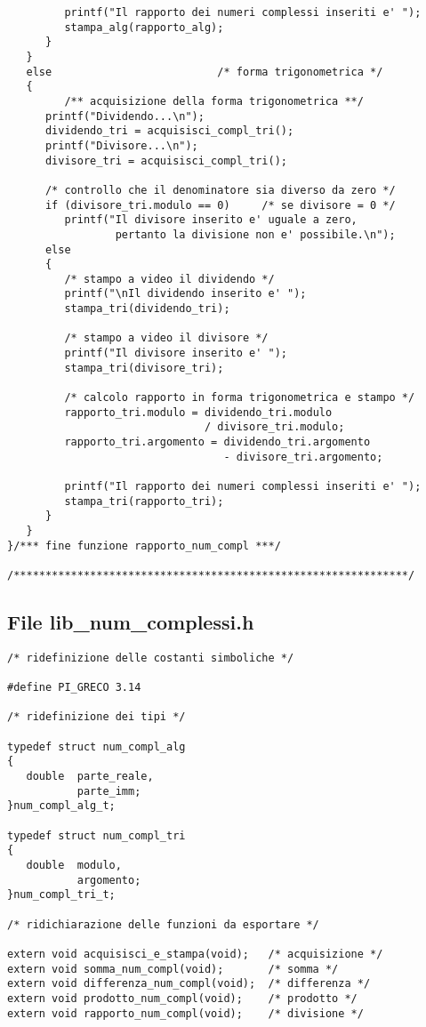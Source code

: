 \documentclass[a4paper,10pt]{article}
\begin{document}
\begin{verbatim}
         printf("Il rapporto dei numeri complessi inseriti e' ");
         stampa_alg(rapporto_alg);
      }
   }
   else	                         /* forma trigonometrica */
   {
         /** acquisizione della forma trigonometrica **/
      printf("Dividendo...\n");
      dividendo_tri = acquisisci_compl_tri();
      printf("Divisore...\n");
      divisore_tri = acquisisci_compl_tri();

      /* controllo che il denominatore sia diverso da zero */
      if (divisore_tri.modulo == 0)     /* se divisore = 0 */
         printf("Il divisore inserito e' uguale a zero,
                 pertanto la divisione non e' possibile.\n");
      else
      {
         /* stampo a video il dividendo */
         printf("\nIl dividendo inserito e' ");
         stampa_tri(dividendo_tri);
	
         /* stampo a video il divisore */
         printf("Il divisore inserito e' ");
         stampa_tri(divisore_tri);
	
         /* calcolo rapporto in forma trigonometrica e stampo */
         rapporto_tri.modulo = dividendo_tri.modulo
                               / divisore_tri.modulo;
         rapporto_tri.argomento = dividendo_tri.argomento
                                  - divisore_tri.argomento;
	
         printf("Il rapporto dei numeri complessi inseriti e' ");
         stampa_tri(rapporto_tri);
      }
   }
}/*** fine funzione rapporto_num_compl ***/

/**************************************************************/
\end{verbatim}						%

\subsection*{File lib\_num\_complessi.h}		%
\begin{verbatim}
/* ridefinizione delle costanti simboliche */

#define PI_GRECO 3.14

/* ridefinizione dei tipi */

typedef struct num_compl_alg
{
   double  parte_reale,		
           parte_imm;		
}num_compl_alg_t;

typedef struct num_compl_tri		
{
   double  modulo,
           argomento;
}num_compl_tri_t;

/* ridichiarazione delle funzioni da esportare */

extern void acquisisci_e_stampa(void);   /* acquisizione */
extern void somma_num_compl(void);       /* somma */
extern void differenza_num_compl(void);	 /* differenza */
extern void prodotto_num_compl(void);    /* prodotto */
extern void rapporto_num_compl(void);    /* divisione */
\end{verbatim}						%
\end{document}

